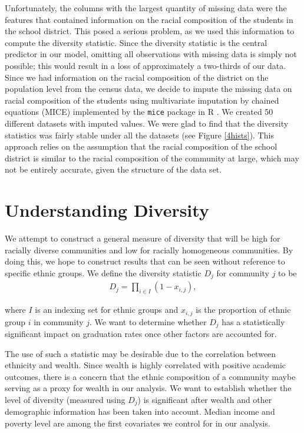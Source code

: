 \documentclass{article}
\begin{document}
Unfortunately, the columns with the largest quantity of missing data were the features that contained information on the racial composition of the students in the school district.  This posed a serious problem, as we used this information to compute the diversity statistic. Since the diversity statistic is the central predictor in our model, omitting all observations with missing data is simply not possible; this would result in a loss of approximately a two-thirds of our data.  Since we had information on the racial composition of the district on the population level from the census data, we decide to impute the missing data on racial composition of the students using multivariate imputation by chained equations (MICE) implemented by the \texttt{mice} package in R \cite{mice}.  We created 50 different datasets with imputed values. We were glad to find that the diversity statistics was fairly stable under all the datasets (see Figure \ref{4hists}).  This approach relies on the assumption that the racial composition of the school district is similar to the racial composition of the community at large, which may not be entirely accurate, given the structure of the data set.

\section{Understanding Diversity}

We attempt to construct a general measure of diversity that will be high for racially diverse communities and low for racially homogeneous communities.  By doing this, we hope to construct results that can be seen without reference to specific ethnic groups.  We define the diversity statistic $D_j$ for community $j$ to be
\begin{align*}
 D_j = \prod_{i \in I}(1-x_{i,j}),
\end{align*}

where $I$ is an indexing set for ethnic groups and $x_{i,j}$ is the proportion of ethnic group $i$ in community $j$.  We want to determine whether $D_j$ has a statistically significant impact on graduation rates once other factors are accounted for.  

The use of such a statistic may be desirable due to the correlation between ethnicity and wealth.  Since wealth is highly correlated with positive academic outcomes, there is a concern that the ethnic composition of a community maybe serving as  a proxy for wealth in our analysis.  We want to establish whether the level of diversity (measured using $D_j$) is significant after wealth and other demographic information has been taken into account. Median income and poverty level are among the first covariates we control for in our analysis.
\end{document}
